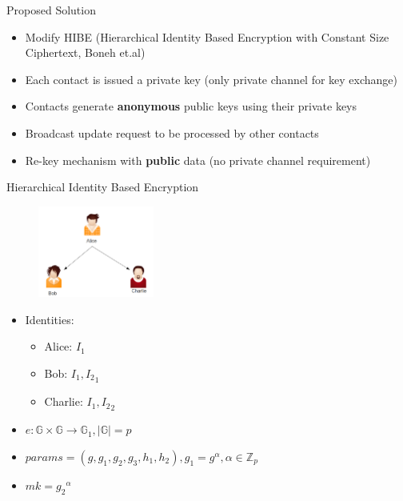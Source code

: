 \documentclass{beamer}
\begin{document}
\begin{frame}{Proposed Solution}
\begin{itemize}
\item Modify HIBE (Hierarchical Identity Based Encryption with
Constant Size Ciphertext, Boneh et.al)
\item Each contact is issued a private key (only private channel for key exchange)
\item Contacts generate \textbf{anonymous} public keys using their private keys
\item Broadcast update request to be processed by other contacts 
\item Re-key mechanism with \textbf{public} data (no private channel requirement)
\end{itemize}
\end{frame}

\begin{frame}{Hierarchical Identity Based Encryption}
\begin{figure}
\includegraphics[height=3cm]{img/img3.png} 
\end{figure}
\pause \begin{itemize}
\item Identities:
 \begin{itemize}
	\item Alice: $I_1$
	\item Bob: $I_1,{I_2}_1$
	\item Charlie: $I_1,{I_2}_2$
\end{itemize}
\pause \item $e : \mathbb{G} \times \mathbb{G} \to \mathbb{G}_1 , |\mathbb{G}| = p$
\pause \item $params = (g, g_1, g_2, g_3, h_1, h_2) ,  g_1 = g^\alpha , \alpha \in \mathbb{Z}_p$
\pause \item $mk = {g_2}^\alpha$
\end{itemize}
\end{frame}
\end{document}
